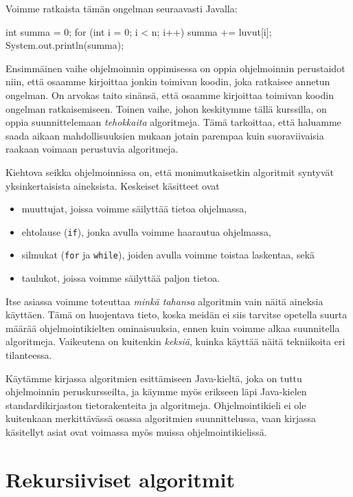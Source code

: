 Voimme ratkaista tämän ongelman seuraavasti Javalla:

\begin{code}
int summa = 0;
for (int i = 0; i < n; i++) {
    summa += luvut[i];
}
System.out.println(summa);
\end{code}

Ensimmäinen vaihe ohjelmoinnin oppimisessa on oppia
ohjelmoinnin perustaidot niin, että osaamme kirjoittaa
jonkin toimivan koodin, joka ratkaisee annetun ongelman.
On arvokas taito sinänsä, että osaamme kirjoittaa
toimivan koodin ongelman ratkaisemiseen.
Toinen vaihe, johon keskitymme tällä kurssilla,
on oppia suunnittelemaan \emph{tehokkaita} algoritmeja.
Tämä tarkoittaa, että haluamme saada aikaan mahdollisuuksien mukaan
jotain parempaa kuin suoraviivaisia
raakaan voimaan perustuvia algoritmeja.

Kiehtova seikka ohjelmoinnissa on, että monimutkaisetkin algoritmit
syntyvät yksinkertaisista aineksista. Keskeiset käsitteet ovat

\begin{itemize}
\item muuttujat, joissa voimme säilyttää tietoa ohjelmassa,
\item ehtolause (\texttt{if}), jonka avulla voimme haarautua ohjelmassa,
\item silmukat (\texttt{for} ja \texttt{while}), joiden avulla voimme
toistaa laskentaa, sekä
\item taulukot, joissa voimme säilyttää paljon tietoa.
\end{itemize}

Itse asiassa voimme toteuttaa \emph{minkä tahansa} algoritmin
vain näitä aineksia käyttäen.
Tämä on huojentava tieto, koska meidän ei siis tarvitse opetella
suurta määrää ohjelmointikielten ominaisuuksia,
ennen kuin voimme alkaa suunnitella algoritmeja.
Vaikeutena on kuitenkin \emph{keksiä}, kuinka käyttää näitä
tekniikoita eri tilanteessa.

Käytämme kirjassa algoritmien esittämiseen Java-kieltä,
joka on tuttu ohjelmoinnin peruskursseilta,
ja käymme myös erikseen läpi Java-kielen
standardikirjaston tietorakenteita ja algoritmeja.
Ohjelmointikieli ei ole kuitenkaan merkittävässä osassa
algoritmien suunnittelussa, vaan kirjassa käsitellyt asiat
ovat voimassa myös muissa ohjelmointikielissä.

\section{Rekursiiviset algoritmit}

